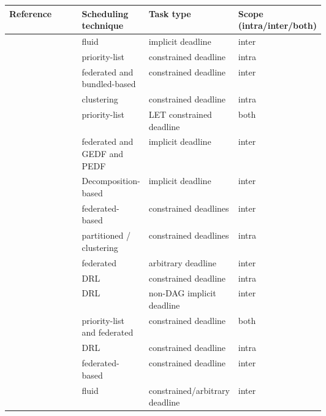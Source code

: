 \begin{table}
    \centering
    \begin{tabular}[]{|l|p{0.20\linewidth}|p{0.20\linewidth}|p{0.20\linewidth}|}
        \hline
        \textbf{Reference} & \textbf{Scheduling technique} & \textbf{Task type} & \textbf{Scope (intra/inter/both)}\\
        \hline
        \cite{guan2021DAGfluid} & fluid & implicit deadline & inter\\
        \hline
        \cite{He2019DagIntra} & priority-list & constrained deadline & intra \\
        \hline
        \cite{Kobayashi2023FedBundledDagsched} & federated and bundled-based & constrained deadline & inter\\
        \hline
        \cite{Xiao2019}  & clustering & constrained deadline & intra\\ 
        \hline
        \cite{Igarashi2020HeuristicContentionFree}  & priority-list & LET constrained deadline & both \\
        \hline
        \cite{jiangUtilTensityBound}  & federated and GEDF and PEDF & implicit deadline & inter\\
        \hline
        \cite{JiangDecompoSchedParallelTask} & Decomposition-based & implicit deadline & inter \\
        \hline
        \cite{He2023DegreeOfParallelism} & federated-based & constrained deadlines & inter \\
        \hline
        \cite{Shi2024DagExecGroups}  & partitioned / clustering & constrained deadlines & intra\\
        \hline
        \cite{Guan2023FederatedNew}  & federated & arbitrary deadline & inter\\
        \hline
        \cite{Zhao2024GATDRLmodel} & DRL & constrained deadline & intra\\
        \hline
        \cite{Xu2023DRLtaskSched} & DRL & non-DAG implicit deadline & inter\\
        \hline
        \cite{Zhao2022DAGsched} & priority-list and federated & constrained deadline & both \\
        \hline
        \cite{Lee2021GlobalDagSchedDRL} & DRL & constrained deadline & intra\\
        \hline
        \cite{Jiang2023SchedVirtualProcs} & federated-based & constrained deadline & inter\\
        \hline
        \cite{GuanFluidDag2022} & fluid & constrained/arbitrary deadline & inter\\

\end{tabular}
\end{table}
